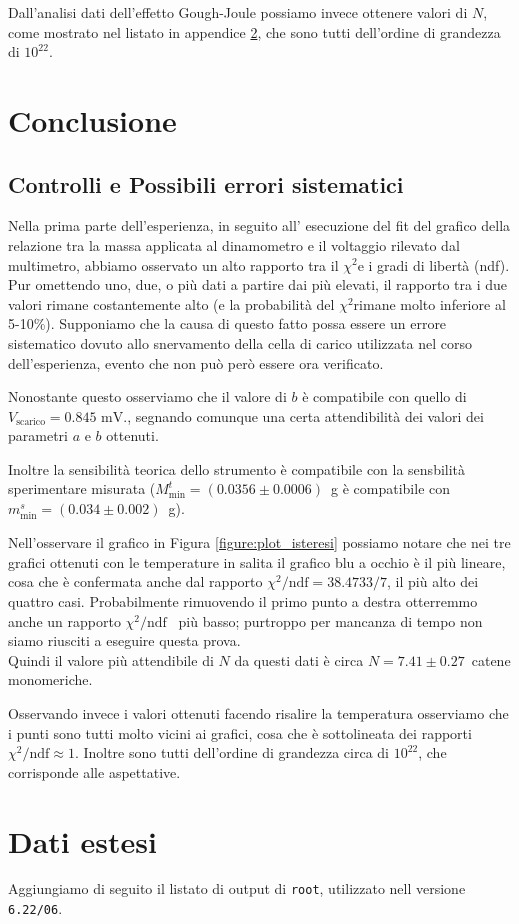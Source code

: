 \documentclass[italian, a4paper, 10pt, twocolumn]{../../style/lab_unige}
\newcommand{\reffig}[1]{Figura {\ref{#1}}}%
\newcommand{\ChiSqr}{$\chi^2$\space}
\newcommand{\ChiNdf}{$\chi^2/\text{ndf}$}
\newcommand{\cernroot}{\texttt{root}}
\begin{document}
    Dall'analisi dati dell'effetto Gough-Joule possiamo invece ottenere valori di $N$, come mostrato nel listato in appendice \ref{section:ext}, che sono tutti dell'ordine di grandezza di $10^{22}$.

    \section{Conclusione}
    \label{section:conclusion}

    \subsection{Controlli e Possibili errori sistematici}

    Nella prima parte dell’esperienza, in seguito all’ esecuzione del fit  del grafico della relazione tra la  massa applicata al dinamometro e il voltaggio rilevato dal multimetro, abbiamo osservato un alto rapporto tra il \ChiSqr e i gradi di libertà (ndf). Pur omettendo uno, due, o più dati a partire dai più elevati, il rapporto tra i due valori rimane costantemente alto (e la probabilità del \ChiSqr rimane molto inferiore al 5-10\%). Supponiamo che la causa di questo fatto possa essere un errore sistematico dovuto allo snervamento della cella di carico utilizzata nel corso dell’esperienza, evento che non può però essere ora verificato.

    Nonostante questo osserviamo che il valore di $b$ è compatibile con quello di $V_{\text{scarico}}=0.845\text{ mV.}$, segnando comunque una certa attendibilità dei valori dei parametri $a$ e $b$ ottenuti.

    Inoltre la sensibilità teorica dello strumento è compatibile con la sensbilità sperimentare misurata ($M_{\text{min}}^t = (0.0356\pm0.0006)$~g è compatibile con $m_{\text{min}}^s=(0.034\pm0.002)$~g).

    Nell'osservare il grafico in \reffig{figure:plot_isteresi} possiamo notare che nei tre grafici ottenuti con le temperature in salita il grafico blu a occhio è il più lineare, cosa che è confermata anche dal rapporto \ChiNdf$=38.4733 / 7$, il più alto dei quattro casi. Probabilmente rimuovendo il primo punto a destra otterremmo anche un rapporto \ChiNdf~ più basso; purtroppo per mancanza di tempo non siamo riusciti a eseguire questa prova.\\
    Quindi il valore più attendibile di $N$ da questi dati è circa $N = 7.41\pm0.27$~catene monomeriche.

    Osservando invece i valori ottenuti facendo risalire la temperatura osserviamo che i punti sono tutti molto vicini ai grafici, cosa che è sottolineata dei rapporti \ChiNdf$\approx1$. Inoltre sono tutti dell'ordine di grandezza circa di $10^{22}$, che corrisponde alle aspettative.


    \appendix


    \section{Dati estesi}
    \label{section:ext}

    Aggiungiamo di seguito il listato di output di \cernroot, utilizzato nell versione \verb|6.22/06|.
    
    
\end{document}
